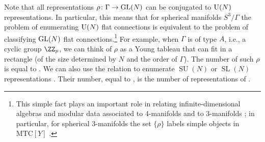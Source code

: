 \documentclass[pdftex]{sigma}
\begin{document}
Note that all representations $\rho\colon \Gamma \to {\rm GL}(N)$ can be conjugated to ${\rm U}(N)$ representations. In particular, this means that for spherical manifolds $S^3 / \Gamma$ the problem of enumerating ${\rm U}(N)$ flat connections is equivalent to the problem of classifying ${\rm GL}(N)$ flat connections.\footnote{This simple fact plays an important role in relating infinite-dimensional algebras and modular data associated to 4-manifolds and to 3-manifolds \cite{FG18}; in particular, for spherical 3-manifolds the set $\{ \rho \}$ labels simple objects in $\text{MTC} [Y]$ \cite{CCFGH18}.} For example, when $\Gamma$ is of type $A$, i.e., a cyclic group $\ZZ_p$, we can think of $\rho$ as a Young tableau that can fit in a rectangle (of the size determined by $N$ and the order of $\Gamma$). The number of such $\rho$ is equal to . We can also use the relation  to enumerate $\operatorname{SU}(N)$ or $\operatorname{SL}(N)$ representations
.
Their number, equal to , is the number of representations of .
\end{document}

